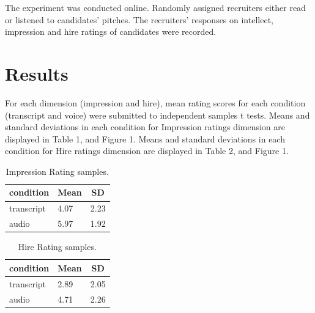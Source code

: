 \documentclass[
  english,
  man]{apa6}
\begin{document}
The experiment was conducted online. Randomly assigned recruiters either read or listened to candidates' pitches. The recruiters' responses on intellect, impression and hire ratings of candidates were recorded.

\hypertarget{results}{%
\section{Results}\label{results}}

For each dimension (impression and hire), mean rating scores for each condition (transcript and voice) were submitted to independent samples t tests. Means and standard deviations in each condition for Impression ratings dimension are displayed in Table 1, and Figure 1. Means and standard deviations in each condition for Hire ratings dimension are displayed in Table 2, and Figure 1.

\begin{table}[tbp]

\begin{center}
\begin{threeparttable}

\caption{\label{tab:unnamed-chunk-2}Impression Rating samples.}

\begin{tabular}{lll}
\toprule
condition & \multicolumn{1}{c}{Mean} & \multicolumn{1}{c}{SD}\\
\midrule
transcript & 4.07 & 2.23\\
audio & 5.97 & 1.92\\
\bottomrule
\end{tabular}

\end{threeparttable}
\end{center}

\end{table}

\begin{table}[tbp]

\begin{center}
\begin{threeparttable}

\caption{\label{tab:unnamed-chunk-2}Hire Rating samples.}

\begin{tabular}{lll}
\toprule
condition & \multicolumn{1}{c}{Mean} & \multicolumn{1}{c}{SD}\\
\midrule
transcript & 2.89 & 2.05\\
audio & 4.71 & 2.26\\
\bottomrule
\end{tabular}

\end{threeparttable}
\end{center}

\end{table}
\end{document}
